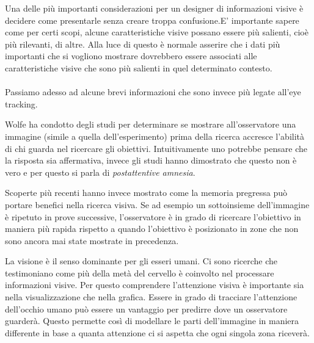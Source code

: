 \documentclass[%
	corpo=12pt,
    twoside,
    stile=classica,
    oldstyle,
    tipotesi=custom,
    greek,
    evenboxes,
]{toptesi}
\begin{document}
{Una delle più importanti considerazioni per un designer di informazioni visive è decidere come presentarle senza creare troppa confusione.E' importante sapere come per certi scopi, alcune caratteristiche visive possano essere più salienti, cioè più rilevanti, di altre. Alla luce di questo è normale asserire che i dati più importanti che si vogliono mostrare dovrebbero essere associati alle caratteristiche visive che sono più salienti in quel determinato contesto. 
\\\\
Passiamo adesso ad alcune brevi informazioni che sono invece più legate all'eye tracking. 

Wolfe ha condotto degli studi per determinare se mostrare all'osservatore una immagine (simile a quella dell'esperimento) prima della ricerca accresce l'abilità di chi guarda nel ricercare gli obiettivi. Intuitivamente uno potrebbe pensare che la risposta sia affermativa, invece gli studi hanno dimostrato che questo non è vero e per questo si parla di \textit{postattentive amnesia}.

Scoperte più recenti hanno invece mostrato come la memoria pregressa può portare benefici nella ricerca visiva. Se ad esempio un sottoinsieme dell'immagine è ripetuto in prove successive, l'osservatore è in grado di ricercare l'obiettivo in maniera più rapida rispetto a quando l'obiettivo è posizionato in zone che non sono ancora mai state mostrate in precedenza.

La visione è il senso dominante per gli esseri umani. Ci sono ricerche che testimoniano come più della metà del cervello è coinvolto nel processare informazioni visive. Per questo comprendere l'attenzione visiva è importante sia nella visualizzazione che nella grafica. Essere in grado di tracciare l'attenzione dell'occhio umano può essere un vantaggio per predirre dove un osservatore guarderà. Questo permette così di modellare le parti dell'immagine in maniera differente in base a quanta attenzione ci si aspetta che ogni singola zona riceverà. 







}
\end{document}
